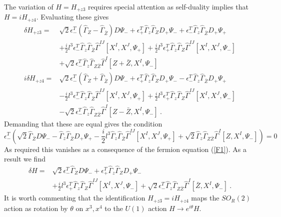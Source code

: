\documentclass[12pt]{article}
\newcommand{\hG}{{\hat \Gamma}}
\newcommand{\nn}{\nonumber}
\numberwithin{equation}{section}
\begin{document}
The variation of $H=H_{+z3}$ requires special attention as self-duality implies
that $H = iH_{+z4}$. Evaluating these gives
\begin{align}
\delta H_{+z3} =&   \sqrt{2} \epsilon^T_- \left( \hat{\Gamma}_Z  - \hat{\Gamma}_{\bar{Z}} \right) D\Psi_- + \epsilon^T_+ \hat{\Gamma}_z \hat{\Gamma}_Z D_+ \Psi_- + \epsilon^T_- \hat{\Gamma}_z \hat{\Gamma}_{\bar{Z}} D_+ \Psi_+ \nonumber \\ & + \frac{i}{2}l^3 \epsilon^T_- \hat{\Gamma}_z \hat{\Gamma}_{\bar{Z}} \hat{\Gamma}^{IJ} \left[ X^I, X^J, \Psi_+  \right] + \frac{i}{2}l^3 \epsilon^T_+ \hat{\Gamma}_z \hat{\Gamma}_Z  \hat{\Gamma}^{IJ} \left[ X^I, X^J, \Psi_-  \right]\nn\\
&+\sqrt{2}\epsilon_-^T\hG_z\hG_{Z\bar Z}\hG^I[Z+\bar Z,X^I,\Psi_-]\nn\\
i\delta H_{+z4} =
&     \sqrt{2} \epsilon^T_- \left( \hat{\Gamma}_Z  + \hat{\Gamma}_{\bar{Z}} \right) D\Psi_- + \epsilon^T_+ \hat{\Gamma}_z \hat{\Gamma}_Z D_+ \Psi_- -\epsilon^T_- \hat{\Gamma}_z \hat{\Gamma}_{\bar{Z}} D_+ \Psi_+ \nonumber \\ & - \frac{i}{2}l^3 \epsilon^T_- \hat{\Gamma}_z \hat{\Gamma}_{\bar{Z}} \hat{\Gamma}^{IJ} \left[ X^I, X^J, \Psi_+  \right] + \frac{i}{2}l^3 \epsilon^T_+ \hat{\Gamma}_z \hat{\Gamma}_Z  \hat{\Gamma}^{IJ} \left[ X^I, X^J, \Psi_-  \right]\nn\\
&-\sqrt{2}\epsilon_-^T\hG_z\hG_{Z\bar Z}\hG^I[Z-\bar Z,X^I,\Psi_-]\ .
  \end{align}
Demanding that these are equal gives the condition
\begin{equation}
\epsilon^T_- \left(\sqrt{2} \hat{\Gamma}_{\bar{Z}}    D\Psi_- - \hat{\Gamma}_z \hat{\Gamma}_{\bar{Z}} D_+ \Psi_+   -\frac{i}{2}l^3  \hat{\Gamma}_z \hat{\Gamma}_{\bar{Z}} \hat{\Gamma}^{IJ} \left[ X^I, X^J, \Psi_+  \right]   +\sqrt{2}\hG_z\hG_{Z\bar Z}\hG^I[Z ,X^I,\Psi_-]  \right)=0
\end{equation}
As required this vanishes as a consequence of the fermion equation (\ref{F1}). As a result we find
\begin{align}
\delta H =
&   \sqrt{2} \epsilon^T_-  \hat{\Gamma}_Z    D\Psi_- + \epsilon^T_+ \hat{\Gamma}_z \hat{\Gamma}_Z D_+ \Psi_-  \nn\\
& + \frac{i}{2}l^3 \epsilon^T_+ \hat{\Gamma}_z \hat{\Gamma}_Z  \hat{\Gamma}^{IJ} \left[ X^I, X^J, \Psi_-  \right] + \sqrt{2}\epsilon_-^T\hG_z\hG_{Z\bar Z}\hG^I[\bar Z,X^I,\Psi_-]\ .
\end{align}
It is worth commenting that the identification $H_{+z3}=iH_{+z4}$ maps the   $SO_R(2)$ action as rotation by $\theta$ on $x^3,x^4$ to the $U(1)$ action 
$H\to e^{i\theta}H$.
\end{document}
